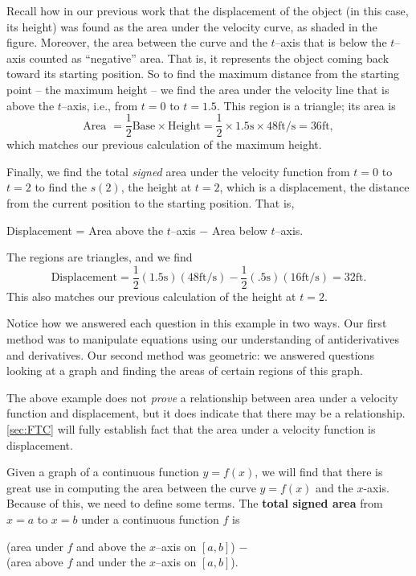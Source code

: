 {Recall how in our previous work that the displacement of the object (in this case, its height) was found as the area under the velocity curve, as shaded in the figure. Moreover, the area between the curve and the $t$--axis that is below the $t$--axis counted as ``negative'' area. That is, it represents the object coming back toward its starting position. So to find the maximum distance from the starting point -- the maximum height -- we find the area under the velocity line that is above the $t$--axis, i.e., from $t=0$ to $t=1.5$. This region is a triangle; its area is 
\[\text{Area } = \frac12\text{Base} \times \text{Height} =\frac12\times 1.5\text{s}\times 48\text{ft/s} = 36\text{ft},\]
which matches our previous calculation of the maximum height.

Finally, we find the total \textit{signed} area under the velocity function from $t=0$ to $t=2$ to find the $s(2)$, the height at $t=2$, which is a displacement, the distance from the current position to the starting position. That is,
	\begin{center}
	Displacement = Area above the $t$--axis $-$ Area below $t$--axis.
	\end{center}
	The regions are triangles, and we find 
	\[\text{Displacement} = \frac12(1.5\text{s})(48\text{ft/s}) - \frac12(.5\text{s})(16\text{ft/s}) = 32\text{ft}.\]
This also matches our previous calculation of the height at $t=2$.

Notice how we answered each question in this example in two ways. Our first method was to manipulate equations using our understanding of antiderivatives and derivatives. Our second method was geometric: we answered questions looking at a graph and finding the areas of certain regions of this graph.}

The above example does not \textit{prove} a relationship between area under a velocity function and displacement, but it does indicate that there may be a relationship. \autoref{sec:FTC} will fully establish fact that the area under a velocity function is displacement.

Given a graph of a continuous function $y=f(x)$, we will find that there is great use in computing the area between the curve $y=f(x)$ and the $x$-axis. Because of this, we need to define some terms.  The \textbf{total signed area} from $x=a$ to $x=b$ under a continuous function $f$ is
\begin{center}
(area  under $f$ and above the $x$--axis on $[a,b]$) $-$ \quad\\
\qquad(area above $f$ and under the $x$--axis on $[a,b]$).
\end{center}

